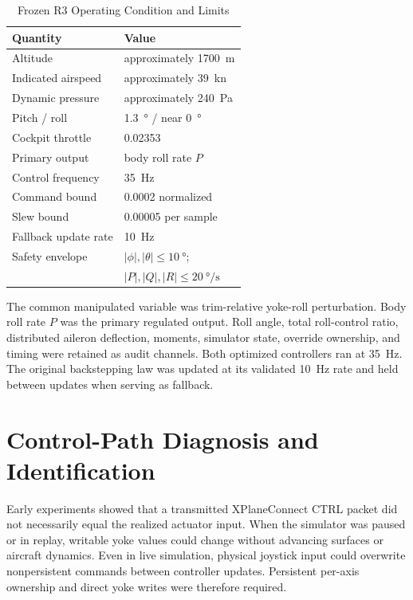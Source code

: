 \documentclass[conference]{IEEEtran}
\begin{document}
\begin{table}[t]
\caption{Frozen R3 Operating Condition and Limits}
\label{tab:condition}
\centering
\begin{tabular}{@{}ll@{}}
\toprule
Quantity & Value \\
\midrule
Altitude & approximately \SI{1700}{\metre} \\
Indicated airspeed & approximately \SI{39}{\knot} \\
Dynamic pressure & approximately \SI{240}{\pascal} \\
Pitch / roll & \SI{1.3}{\degree} / near \SI{0}{\degree} \\
Cockpit throttle & 0.02353 \\
Primary output & body roll rate $P$ \\
Control frequency & \SI{35}{\hertz} \\
Command bound & 0.0002 normalized \\
Slew bound & 0.00005 per sample \\
Fallback update rate & \SI{10}{\hertz} \\
Safety envelope & $|\phi|,|\theta|\leq\SI{10}{\degree}$; \\
 & $|P|,|Q|,|R|\leq\SI{20}{\degree\per\second}$ \\
\bottomrule
\end{tabular}
\end{table}

The common manipulated variable was trim-relative yoke-roll perturbation. Body
roll rate $P$ was the primary regulated output. Roll angle, total roll-control
ratio, distributed aileron deflection, moments, simulator state, override
ownership, and timing were retained as audit channels. Both optimized
controllers ran at \SI{35}{\hertz}. The original backstepping law was updated at its
validated \SI{10}{\hertz} rate and held between updates when serving as fallback.

\section{Control-Path Diagnosis and Identification}
Early experiments showed that a transmitted XPlaneConnect CTRL packet did not
necessarily equal the realized actuator input. When the simulator was paused or
in replay, writable yoke values could change without advancing surfaces or
aircraft dynamics. Even in live simulation, physical joystick input could
overwrite nonpersistent commands between controller updates. Persistent
per-axis ownership and direct yoke writes were therefore required.
\end{document}
